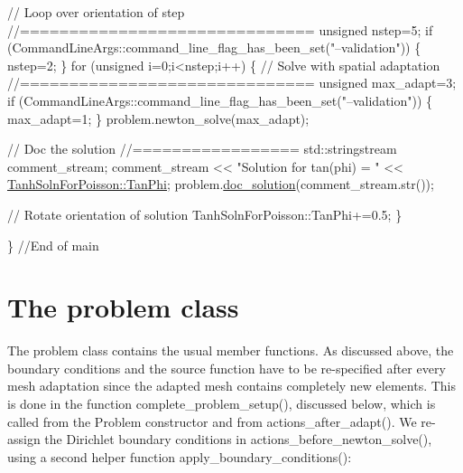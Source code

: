 \begin{DoxyCodeInclude}
 \textcolor{comment}{// Loop over orientation of step}
 \textcolor{comment}{//==============================}
 \textcolor{keywordtype}{unsigned} nstep=5;
 \textcolor{keywordflow}{if} (CommandLineArgs::command\_line\_flag\_has\_been\_set(\textcolor{stringliteral}{"--validation"}))
  \{
   nstep=2;
  \}
 \textcolor{keywordflow}{for} (\textcolor{keywordtype}{unsigned} i=0;i<nstep;i++)
  \{
   \textcolor{comment}{// Solve with spatial adaptation}
   \textcolor{comment}{//==============================}
   \textcolor{keywordtype}{unsigned} max\_adapt=3;
   \textcolor{keywordflow}{if} (CommandLineArgs::command\_line\_flag\_has\_been\_set(\textcolor{stringliteral}{"--validation"}))
    \{
     max\_adapt=1;
    \}
   problem.newton\_solve(max\_adapt);

   \textcolor{comment}{// Doc the solution}
   \textcolor{comment}{//=================}
   std::stringstream comment\_stream;
   comment\_stream << \textcolor{stringliteral}{"Solution for tan(phi) = "} << \hyperlink{namespaceTanhSolnForPoisson_a785ccd00a727125a5138fbbcac173294}{TanhSolnForPoisson::TanPhi}; 
   problem.\hyperlink{classUnstructuredPoissonProblem_a9b21a3c3f574da71411f852006fe2a0c}{doc\_solution}(comment\_stream.str());
   
   \textcolor{comment}{// Rotate orientation of solution}
   TanhSolnForPoisson::TanPhi+=0.5;
  \}   
 
\} \textcolor{comment}{//End of main}

\end{DoxyCodeInclude}




 

\hypertarget{index_problem}{}\section{The problem class}\label{index_problem}
The problem class contains the usual member functions. As discussed above, the boundary conditions and the source function have to be re-\/specified after every mesh adaptation since the adapted mesh contains completely new elements. This is done in the function {\ttfamily complete\+\_\+problem\+\_\+setup()}, discussed below, which is called from the Problem constructor and from {\ttfamily actions\+\_\+after\+\_\+adapt()}. We re-\/assign the Dirichlet boundary conditions in {\ttfamily actions\+\_\+before\+\_\+newton\+\_\+solve()}, using a second helper function {\ttfamily apply\+\_\+boundary\+\_\+conditions()}\+:

